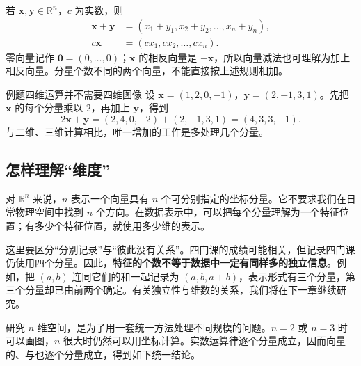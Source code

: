 \documentclass[a4paper,12pt,twoside,openany,fontset=none]{ctexbook}
\newcounter{example}[chapter]
\newenvironment{example}[1][]{\begin{exBox}{例题}{#1}}{\end{exBox}}
\numberwithin{equation}{chapter}
\begin{document}
若 $\boldsymbol{x},\boldsymbol{y}\in\mathbb{R}^n$，$c$ 为实数，则
\begin{align*}
    \boldsymbol{x}+\boldsymbol{y}
        &=(x_1+y_1,x_2+y_2,\ldots,x_n+y_n),\\
    c\boldsymbol{x}&=(cx_1,cx_2,\ldots,cx_n).
\end{align*}
零向量记作 $\boldsymbol{0}=(0,\ldots,0)$；$\boldsymbol{x}$ 的相反向量是 $-\boldsymbol{x}$，所以向量减法也可理解为加上相反向量。分量个数不同的两个向量，不能直接按上述规则相加。

\begin{example}[四维运算并不需要四维图像]
设 $\boldsymbol{x}=(1,2,0,-1)$，$\boldsymbol{y}=(2,-1,3,1)$。先把 $\boldsymbol{x}$ 的每个分量乘以 $2$，再加上 $\boldsymbol{y}$，得到
\[
    2\boldsymbol{x}+\boldsymbol{y}
    =(2,4,0,-2)+(2,-1,3,1)=(4,3,3,-1).
\]
与二维、三维计算相比，唯一增加的工作是多处理几个分量。
\end{example}

\subsection*{怎样理解“维度”}

对 $\mathbb{R}^n$ 来说，$n$ 表示一个向量具有 $n$ 个可分别指定的坐标分量。它不要求我们在日常物理空间中找到 $n$ 个方向。在数据表示中，可以把每个分量理解为一个特征位置；有多少个特征位置，就使用多少维的表示。

这里要区分“分别记录”与“彼此没有关系”。四门课的成绩可能相关，但记录四门课仍使用四个分量。因此，\textbf{特征的个数不等于数据中一定有同样多的独立信息}。例如，把 $(a,b)$ 连同它们的和一起记录为 $(a,b,a+b)$，表示形式有三个分量，第三个分量却已由前两个确定。有关独立性与维数的关系，我们将在下一章继续研究。

研究 $n$ 维空间，是为了用一套统一方法处理不同规模的问题。$n=2$ 或 $n=3$ 时可以画图，$n$ 很大时仍然可以用坐标计算。实数运算律逐个分量成立，因而向量的、与也逐个分量成立，得到如下统一结论。
\end{document}
